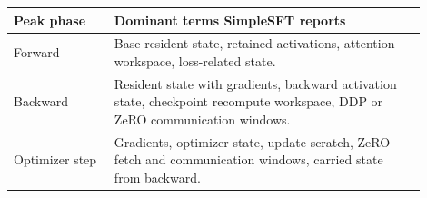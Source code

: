 \begin{center}
\small
\begin{tabular}{@{}p{0.22\linewidth}p{0.68\linewidth}@{}}
\toprule
Peak phase & Dominant terms SimpleSFT reports \\
\midrule
Forward & Base resident state, retained activations, attention workspace,
loss-related state. \\
Backward & Resident state with gradients, backward activation state,
checkpoint recompute workspace, DDP or ZeRO communication windows. \\
Optimizer step & Gradients, optimizer state, update scratch, ZeRO fetch and
communication windows, carried state from backward. \\
\bottomrule
\end{tabular}
\normalsize
\end{center}
